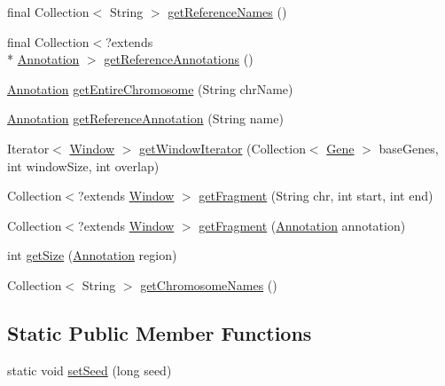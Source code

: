 \begin{DoxyCompactItemize}
\item 
final Collection$<$ String $>$ \hyperlink{classumms_1_1core_1_1coordinatesystem_1_1_genomic_space_a8f4a8587b9f12cb6644d9b2dc320259f}{get\+Reference\+Names} ()
\item 
final Collection$<$?extends \\*
\hyperlink{interfaceumms_1_1core_1_1annotation_1_1_annotation}{Annotation} $>$ \hyperlink{classumms_1_1core_1_1coordinatesystem_1_1_genomic_space_a9c50958fee98b103c73b8787d2818ac5}{get\+Reference\+Annotations} ()
\item 
\hyperlink{interfaceumms_1_1core_1_1annotation_1_1_annotation}{Annotation} \hyperlink{classumms_1_1core_1_1coordinatesystem_1_1_genomic_space_aed8d04961988d74e80e84061d202d9eb}{get\+Entire\+Chromosome} (String chr\+Name)
\item 
\hyperlink{interfaceumms_1_1core_1_1annotation_1_1_annotation}{Annotation} \hyperlink{classumms_1_1core_1_1coordinatesystem_1_1_genomic_space_a791e805d7bcff80b9992473d7f3ce166}{get\+Reference\+Annotation} (String name)
\item 
Iterator$<$ \hyperlink{interfaceumms_1_1core_1_1feature_1_1_window}{Window} $>$ \hyperlink{classumms_1_1core_1_1coordinatesystem_1_1_genomic_space_ada1e6c4f51d938cd0b378b5697f48803}{get\+Window\+Iterator} (Collection$<$ \hyperlink{classumms_1_1core_1_1annotation_1_1_gene}{Gene} $>$ base\+Genes, int window\+Size, int overlap)
\item 
Collection$<$?extends \hyperlink{interfaceumms_1_1core_1_1feature_1_1_window}{Window} $>$ \hyperlink{classumms_1_1core_1_1coordinatesystem_1_1_genomic_space_af398b7d440b6c3d7090232b6755a67f3}{get\+Fragment} (String chr, int start, int end)
\item 
Collection$<$?extends \hyperlink{interfaceumms_1_1core_1_1feature_1_1_window}{Window} $>$ \hyperlink{classumms_1_1core_1_1coordinatesystem_1_1_genomic_space_a1903e2d0df55618b1a2e31b604fbeeba}{get\+Fragment} (\hyperlink{interfaceumms_1_1core_1_1annotation_1_1_annotation}{Annotation} annotation)
\item 
int \hyperlink{classumms_1_1core_1_1coordinatesystem_1_1_genomic_space_a426572ebde2b646b760564f610a8e618}{get\+Size} (\hyperlink{interfaceumms_1_1core_1_1annotation_1_1_annotation}{Annotation} region)
\item 
Collection$<$ String $>$ \hyperlink{classumms_1_1core_1_1coordinatesystem_1_1_genomic_space_afbc8bbc4fdf502dc86864b70c01e942e}{get\+Chromosome\+Names} ()
\end{DoxyCompactItemize}
\subsection*{Static Public Member Functions}
\begin{DoxyCompactItemize}
\item 
static void \hyperlink{classumms_1_1core_1_1coordinatesystem_1_1_genomic_space_a3d4fc4c0f29817931209f7b07f341838}{set\+Seed} (long seed)
\end{DoxyCompactItemize}
